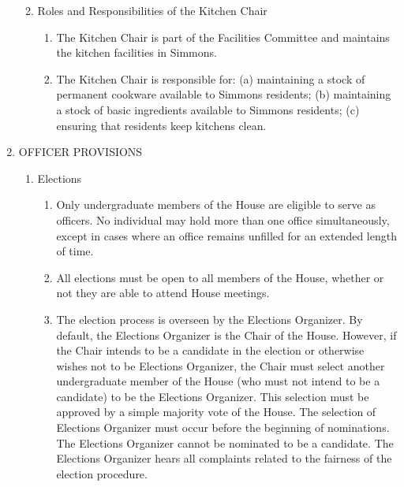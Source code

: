\documentclass[letterpaper]{article}
\begin{document}
\begin{enumerate}
\begin{enumerate}
\begin{enumerate}
\end{enumerate}

\item Roles and Responsibilities of the Kitchen Chair

\begin{enumerate}

\item The Kitchen Chair is part of the Facilities Committee and maintains the kitchen facilities in Simmons.

\item The Kitchen Chair is responsible for: (a) maintaining a stock of permanent cookware available to Simmons residents; (b) maintaining a stock of basic ingredients available to Simmons residents; (c) ensuring that residents keep kitchens clean.

\end{enumerate}

\end{enumerate}

\item OFFICER PROVISIONS

\begin{enumerate}

\item Elections

\begin{enumerate}

\item Only undergraduate members of the House are eligible to serve as officers. No individual may hold more than one office simultaneously, except in cases where an office remains unfilled for an extended length of time.

\item All elections must be open to all members of the House, whether or not they are able to attend House meetings.

\item The election process is overseen by the Elections Organizer. By default, the Elections Organizer is the Chair of the House. However, if the Chair intends to be a candidate in the election or otherwise wishes not to be Elections Organizer, the Chair must select another undergraduate member of the House (who must not intend to be a candidate) to be the Elections Organizer. This selection must be approved by a simple majority vote of the House. The selection of Elections Organizer must occur before the beginning of nominations. The Elections Organizer cannot be nominated to be a candidate. The Elections Organizer hears all complaints related to the fairness of the election procedure.


\end{enumerate}
\end{enumerate}
\end{enumerate}
\end{document}
